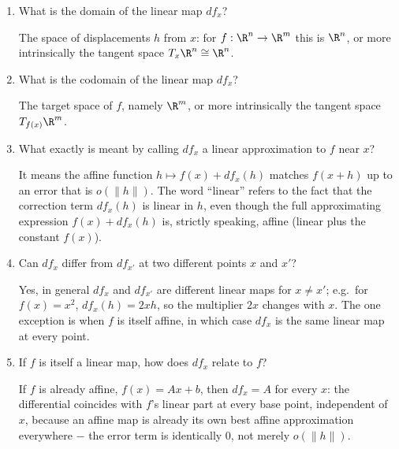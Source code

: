 \documentclass{self-check}
\begin{document}
\begin{enumerate}[resume, leftmargin=*, itemsep=8pt]
    \begin{answer}
      \(x\) fixes which linear map is being used, and \(h\) fixes which input is fed into that map. Changing \(x\) can change the map itself (a different point can have a different derivative), while changing \(h\) only changes the output of the same fixed map; both pieces of data are needed to determine the number \(df_{x}(h)\).
    \end{answer}
  \item What is the domain of the linear map \(df_{x}\)?
    \begin{answer}
      The space of displacements \(h\) from \(x\): for \(f:\R^{n}\to\R^{m}\) this is \(\R^{n}\), or more intrinsically the tangent space \(T_{x}\R^{n}\cong\R^{n}\).
    \end{answer}
  \item What is the codomain of the linear map \(df_{x}\)?
    \begin{answer}
      The target space of \(f\), namely \(\R^{m}\), or more intrinsically the tangent space \(T_{f(x)}\R^{m}\).
    \end{answer}
  \item What exactly is meant by calling \(df_{x}\) a linear approximation to \(f\) near \(x\)?
    \begin{answer}
      It means the affine function \(h\mapsto f(x)+df_{x}(h)\) matches \(f(x+h)\) up to an error that is \(o(\|h\|)\). The word ``linear'' refers to the fact that the correction term \(df_{x}(h)\) is linear in \(h\), even though the full approximating expression \(f(x)+df_{x}(h)\) is, strictly speaking, affine (linear plus the constant \(f(x)\)).
    \end{answer}
  \item Can \(df_{x}\) differ from \(df_{x'}\) at two different points \(x\) and \(x'\)?
    \begin{answer}
      Yes, in general \(df_{x}\) and \(df_{x'}\) are different linear maps for \(x\ne x'\); e.g.\ for \(f(x)=x^{2}\), \(df_{x}(h)=2xh\), so the multiplier \(2x\) changes with \(x\). The one exception is when \(f\) is itself affine, in which case \(df_{x}\) is the same linear map at every point.
    \end{answer}
  \item If \(f\) is itself a linear map, how does \(df_{x}\) relate to \(f\)?
    \begin{answer}
      If \(f\) is already affine, \(f(x)=Ax+b\), then \(df_{x}=A\) for every \(x\): the differential coincides with \(f\)'s linear part at every base point, independent of \(x\), because an affine map is already its own best affine approximation everywhere \(-\) the error term is identically \(0\), not merely \(o(\|h\|)\).

\end{answer}
\end{enumerate}
\end{document}
